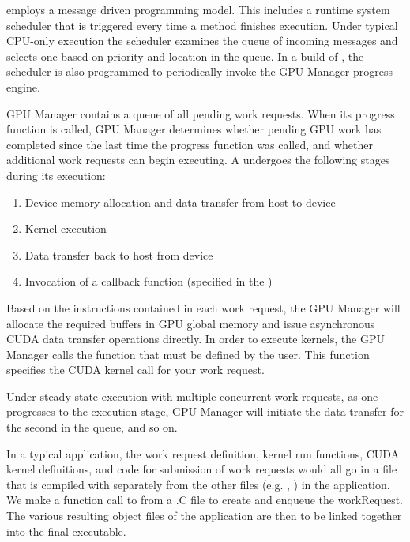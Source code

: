 \documentclass[10pt]{report}
\begin{document}
\charmpp{} employs a message driven programming model. This includes a runtime
system scheduler that is triggered every time a method finishes execution. Under
typical CPU-only execution the scheduler examines the queue of incoming messages
and selects one based on priority and location in the queue. In a \cuda{}
build of \charmpp{}, the scheduler is also programmed to periodically invoke the
GPU Manager progress engine.

GPU Manager contains a queue of all pending work requests. When its progress
function is called, GPU Manager determines whether pending GPU work has
completed since the last time the progress function was called, and whether
additional work requests can begin executing. A  undergoes the
following stages during its execution:

\begin{enumerate}
\item Device memory allocation and data transfer from host to device
\item Kernel execution
\item Data transfer back to host from device
\item Invocation of a callback function (specified in the )
\end{enumerate}

Based on the instructions contained in each work request, the GPU Manager will
allocate the required buffers in GPU global memory and issue asynchronous CUDA
data transfer operations directly. In order to execute kernels, the GPU Manager
calls the  function that must be defined by the user. This
function specifies the CUDA kernel call for your work request.

Under steady state execution with multiple concurrent work requests, as
one  progresses to the execution stage, GPU Manager will
initiate the data transfer for the second
 in the queue, and so on.

In a typical application, the work request definition,
kernel run functions, CUDA kernel definitions, and code for submission
of work requests would all go in a  file that is compiled with
 separately from the other files (e.g. , ) in the
\charmpp{} application.
We make a function call to  from a .C file to create
and enqueue the workRequest.
The various resulting object files of the application are then to be linked
together into the final executable.
\end{document}
